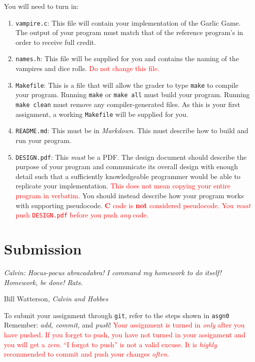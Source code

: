 \documentclass[11pt]{article}
\begin{document}
\noindent You will need to turn in:
\begin{enumerate}
  \item \texttt{vampire.c}: This file will contain your implementation of the
    Garlic Game. The output of your program must match that of the reference
    program's in order to receive full credit.

  \item \texttt{names.h}: This file will be supplied for you and contains the
    naming of the vampires and dice rolls. \textcolor{red}{{Do not change
    this file.}}

  \item \texttt{Makefile}: This is a file that will allow the grader to type
    \texttt{make} to compile your program. Running \texttt{make} or \texttt{make
    all} must build your program. Running \texttt{make clean} must remove any
    compiler-generated files. As this is your first assignment, a working
    \texttt{Makefile} will be supplied for you.

  \item \texttt{README.md}: This must be in \emph{Markdown}. This must describe
    how to build and run your program.

  \item \texttt{DESIGN.pdf}: This \emph{must} be a PDF\@. The design document
    should describe the purpose of your program and communicate its overall
    design with enough detail such that a sufficiently knowledgeable programmer
    would be able to replicate your implementation.  \textcolor{red}{This does
    not mean copying your entire program in verbatim.} You should instead
    describe how your program works with supporting pseudocode.
    \textcolor{red}{\textbf{C} code is \textbf{not} considered pseudocode. You
    \emph{must} push \texttt{DESIGN.pdf} before you push \emph{any} code.}
\end{enumerate}


\section{Submission}

\epigraph{\emph{Calvin: Hocus-pocus abracadabra! I command my homework to do
itself! Homework, be done! Rats.}}{Bill Watterson, \emph{Calvin and Hobbes}}

To submit your assignment through \texttt{git}, refer to the steps shown in
\texttt{asgn0} Remember: \emph{add, commit,} and \emph{push}!
\textcolor{red}{Your assignment is turned in \emph{only} after you have pushed.
If you forget to push, you have not turned in your assignment and you will get a
\emph{zero}. ``I forgot to push'' is not a valid excuse. It is \emph{highly}
recommended to commit and push your changes \emph{often}.}
\end{document}
